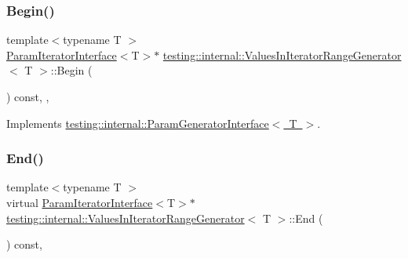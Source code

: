 \subsubsection{\texorpdfstring{Begin()}{Begin()}\hspace{0.1cm}{\footnotesize\ttfamily [3/3]}}
{\footnotesize\ttfamily template$<$typename T $>$ \\
\mbox{\hyperlink{classtesting_1_1internal_1_1_param_iterator_interface}{Param\+Iterator\+Interface}}$<$T$>$$\ast$ \mbox{\hyperlink{classtesting_1_1internal_1_1_values_in_iterator_range_generator}{testing\+::internal\+::\+Values\+In\+Iterator\+Range\+Generator}}$<$ T $>$\+::Begin (\begin{DoxyParamCaption}{ }\end{DoxyParamCaption}) const\hspace{0.3cm}{\ttfamily [inline]}, {\ttfamily [override]}, {\ttfamily [virtual]}}



Implements \mbox{\hyperlink{classtesting_1_1internal_1_1_param_generator_interface_ae1de83b16fe9a53c67778a026c6a9569}{testing\+::internal\+::\+Param\+Generator\+Interface$<$ T $>$}}.

\mbox{\label{classtesting_1_1internal_1_1_values_in_iterator_range_generator_a4af95b9eccfc86c40a715df2d9d0df40}} 
\subsubsection{\texorpdfstring{End()}{End()}\hspace{0.1cm}{\footnotesize\ttfamily [1/3]}}
{\footnotesize\ttfamily template$<$typename T $>$ \\
virtual \mbox{\hyperlink{classtesting_1_1internal_1_1_param_iterator_interface}{Param\+Iterator\+Interface}}$<$T$>$$\ast$ \mbox{\hyperlink{classtesting_1_1internal_1_1_values_in_iterator_range_generator}{testing\+::internal\+::\+Values\+In\+Iterator\+Range\+Generator}}$<$ T $>$\+::End (\begin{DoxyParamCaption}{ }\end{DoxyParamCaption}) const\hspace{0.3cm}{\ttfamily [inline]}, {\ttfamily [virtual]}}




